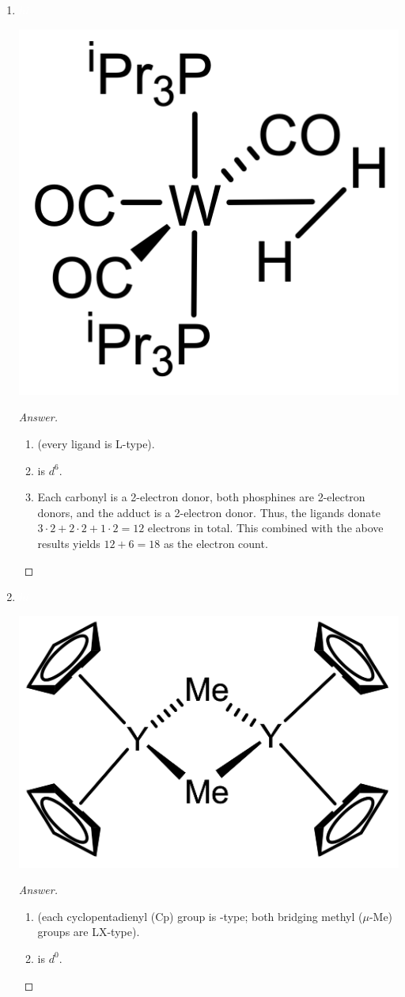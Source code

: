 \documentclass[../psets.tex]{subfiles}
\begin{document}
\begin{enumerate}
\begin{enumerate}[label={\arabic*)}]
\begin{proof}[Answer]
\begin{enumerate}[label={(\roman*)}]
            \end{enumerate}
        \end{proof}
        \item ${\color{white}hi}$
        \begin{center}
            \includegraphics[width=0.18\linewidth]{../ExtFiles/pset1-1-09.png}
        \end{center}
        \begin{proof}[Answer]\leavevmode
            \begin{enumerate}[label={(\roman*)}]
                \item {} (every ligand is L-type).
                \item {} is $d^6$.
                \item Each carbonyl is a 2-electron donor, both phosphines are 2-electron donors, and the  adduct is a 2-electron donor. Thus, the ligands donate $3\cdot 2+2\cdot 2+1\cdot 2=12$ electrons in total. This combined with the above results yields $12+6=18$ as the electron count.
            \end{enumerate}
        \end{proof}
        \newpage
        \item ${\color{white}hi}$
        \vspace{-1em}
        \begin{center}
            \includegraphics[width=0.32\linewidth]{../ExtFiles/pset1-1-10.png}
        \end{center}
        \begin{proof}[Answer]\leavevmode
            \begin{enumerate}[label={(\roman*)}]
                \item {} (each cyclopentadienyl (Cp) group is -type; both bridging methyl ($\mu$-Me) groups are LX-type).
                \item {} is $d^0$.

\end{enumerate}
\end{proof}
\end{enumerate}
\end{enumerate}
\end{document}
